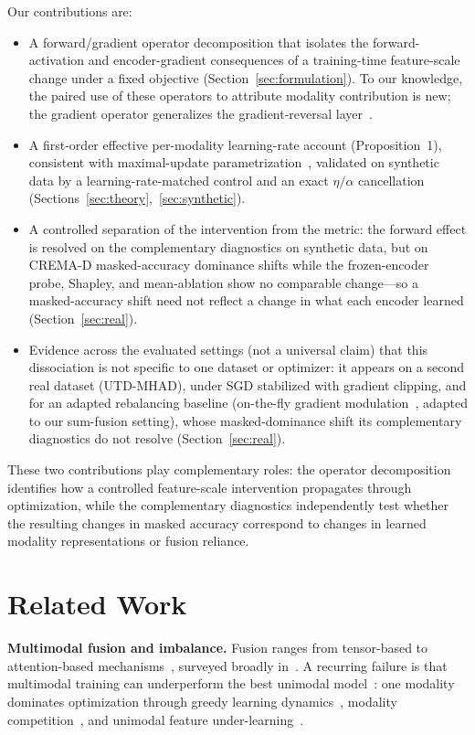 \documentclass[conference]{IEEEtran}
\begin{document}
Our contributions are:
\begin{itemize}
\item A forward/gradient operator decomposition that isolates the forward-activation and encoder-gradient consequences of a training-time feature-scale change under a fixed objective (Section~\ref{sec:formulation}). To our knowledge, the paired use of these operators to attribute modality contribution is new; the gradient operator generalizes the gradient-reversal layer~\cite{ganin2015domain}.
\item A first-order effective per-modality learning-rate account (Proposition~1), consistent with maximal-update parametrization~\cite{yang2022tensor}, validated on synthetic data by a learning-rate-matched control and an exact $\eta/\alpha$ cancellation (Sections~\ref{sec:theory},~\ref{sec:synthetic}).
\item A controlled separation of the intervention from the metric: the forward effect is resolved on the complementary diagnostics on synthetic data, but on CREMA-D masked-accuracy dominance shifts while the frozen-encoder probe, Shapley, and mean-ablation show no comparable change---so a masked-accuracy shift need not reflect a change in what each encoder learned (Section~\ref{sec:real}).
\item Evidence across the evaluated settings (not a universal claim) that this dissociation is not specific to one dataset or optimizer: it appears on a second real dataset (UTD-MHAD), under SGD stabilized with gradient clipping, and for an adapted rebalancing baseline (on-the-fly gradient modulation~\cite{peng2022balanced}, adapted to our sum-fusion setting), whose masked-dominance shift its complementary diagnostics do not resolve (Section~\ref{sec:real}).
\end{itemize}
These two contributions play complementary roles: the operator decomposition identifies how a controlled feature-scale intervention propagates through optimization, while the complementary diagnostics independently test whether the resulting changes in masked accuracy correspond to changes in learned modality representations or fusion reliance.

\section{Related Work}
\textbf{Multimodal fusion and imbalance.} Fusion ranges from tensor-based to attention-based mechanisms~\cite{zadeh2017tensor,nagrani2021attention}, surveyed broadly in~\cite{baltrusaitis2019multimodal,liang2024foundations}. A recurring failure is that multimodal training can underperform the best unimodal model~\cite{wang2020what,huang2021what}: one modality dominates optimization through greedy learning dynamics~\cite{wu2022characterizing}, modality competition~\cite{huang2022modality}, and unimodal feature under-learning~\cite{du2023unimodal}.
\end{document}

